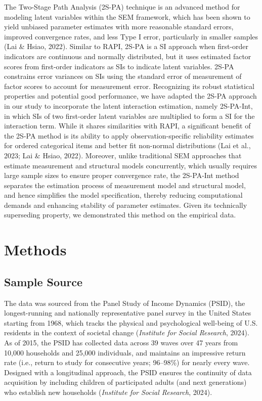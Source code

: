 \documentclass[
  man]{apa7}
\begin{document}
The Two-Stage Path Analysis (2S-PA) technique is an advanced method for modeling latent variables within the SEM framework, which has been shown to yield unbiased parameter estimates with more reasonable standard errors, improved convergence rates, and less Type I error, particularly in smaller samples (Lai \& Hsiao, 2022). Similar to RAPI, 2S-PA is a SI approach when first-order indicators are continuous and normally distributed, but it uses estimated factor scores from first-order indicators as SIs to indicate latent variables. 2S-PA constrains error variances on SIs using the standard error of measurement of factor scores to account for measurement error. Recognizing its robust statistical properties and potential good performance, we have adapted the 2S-PA approach in our study to incorporate the latent interaction estimation, namely 2S-PA-Int, in which SIs of two first-order latent variables are multiplied to form a SI for the interaction term. While it shares similarities with RAPI, a significant benefit of the 2S-PA method is its ability to apply observation-specific reliability estimates for ordered categorical items and better fit non-normal distributions (Lai et al., 2023; Lai \& Hsiao, 2022). Moreover, unlike traditional SEM approaches that estimate measurement and structural models concurrently, which usually requires large sample sizes to ensure proper convergence rate, the 2S-PA-Int method separates the estimation process of measurement model and structural model, and hence
simplifies the model specification, thereby reducing computational demands and enhancing stability of parameter estimates. Given its technically superseding property, we demonstrated this method on the empirical data.

\hypertarget{methods}{%
\section{Methods}\label{methods}}

\hypertarget{sample-source}{%
\subsection{Sample Source}\label{sample-source}}

The data was sourced from the Panel Study of Income Dynamics (PSID), the longest-running and nationally representative panel survey in the United States starting from 1968, which tracks the physical and psychological well-being of U.S. residents in the context of societal change (\emph{Institute for Social Research}, 2024). As of 2015, the PSID has collected data across 39 waves over 47 years from 10,000 households and 25,000 individuals, and maintains an impressive return rate (i.e., return to study for consecutive years; 96--98\%) for nearly every wave. Designed with a longitudinal approach, the PSID ensures the continuity of data acquisition by including children of participated adults (and next generations) who establish new households (\emph{Institute for Social Research}, 2024).
\end{document}
